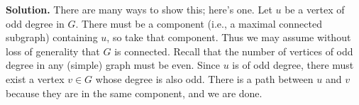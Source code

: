 \documentclass[11pt]{article}
\newcommand{\N}{\mathbb{N}}
\begin{document}
\begin{enumerate}
\begin{enumerate}
\textbf{Solution.} 
There are many ways to show this; here's one. Let $u$ be a vertex of odd degree in $G$. There must be a component (i.e., a maximal connected subgraph) containing $u$, so take that component. Thus we may assume without loss of generality that $G$ is connected. Recall that the number of vertices of odd degree in any (simple) graph must be even. Since $u$ is of odd degree, there must exist a vertex $v \in G$ whose degree is also odd. There is a path between $u$ and $v$ because they are in the same component, and we are done.


	\end{enumerate}




\end{enumerate}
\end{document}
